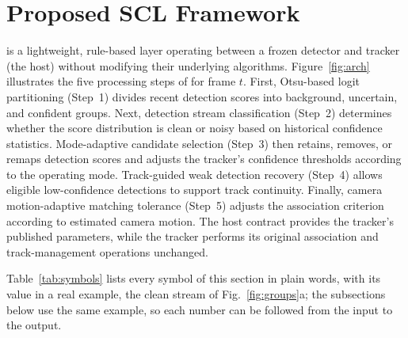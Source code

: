 \section{Proposed SCL Framework}\label{sec:method}

\scl{} is a lightweight, rule-based layer operating between a frozen detector and tracker (the
host) without modifying their underlying algorithms. Figure~\ref{fig:arch} illustrates the five
processing steps of \scl{} for frame $t$. First, Otsu-based logit partitioning (Step~1) divides
recent detection scores into background, uncertain, and confident groups. Next, detection stream
classification (Step~2) determines whether the score distribution is clean or noisy based on
historical confidence statistics. Mode-adaptive candidate selection (Step~3) then retains,
removes, or remaps detection scores and adjusts the tracker's confidence thresholds according to
the operating mode. Track-guided weak detection recovery (Step~4) allows eligible low-confidence
detections to support track continuity. Finally, camera motion-adaptive matching tolerance
(Step~5) adjusts the association criterion according to estimated camera motion. The host
contract provides the tracker's published parameters, while the tracker performs its original
association and track-management operations unchanged.

Table~\ref{tab:symbols} lists every symbol of this section in plain words, with its value in a
real example, the clean stream of Fig.~\ref{fig:groups}a; the subsections below use the same
example, so each number can be followed from the input to the output.





